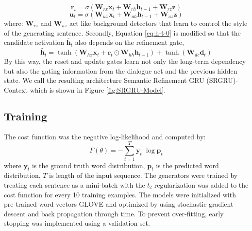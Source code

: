 \documentclass{llncs}
\begin{document}
\begin{equation}\label{eq:r-t-1} 
\textbf{r}_{t}=\sigma ({\textbf{W}_{rx}\textbf{x}_{t}+\textbf{W}_{rh}\textbf{h}_{t-1}+\textbf{W}_{rz}\textbf{z}})
\end{equation}
\begin{equation}\label{eq:u-t-1}
\textbf{u}_{t}=\sigma (\textbf{W}_{ux}\textbf{x}_{t}+\textbf{W}_{uh}\textbf{h}_{t-1}+\textbf{W}_{uz}\textbf{z})
\end{equation}
where: $\textbf{W}_{rz}$ and $\textbf{W}_{uz}$ act like background detectors that learn to control the style of the generating sentence. Secondly, Equation \eqref{eq:h-t-0} is modified so that the candidate activation $\tilde{\textbf{h}_{t}}$ also depends on the refinement gate,
\begin{equation}\label{eq:h-t-2}
\tilde{\textbf{h}_{t}}=\tanh(\textbf{W}_{hx}\textbf{x}_{t}+\textbf{r}_{t}\odot \textbf{W}_{hh}\textbf{h}_{t-1}) + \tanh(\textbf{W}_{dc}\textbf{d}_{t})
\end{equation}
By this way, the reset and update gates learn not only the long-term dependency but also the gating information from the dialogue act and the previous hidden state. We call the resulting architecture Semantic Refinement GRU (SRGRU)-Context which is shown in Figure \ref{fig:SRGRU-Model}.

\subsection{Training}\label{subsec:training}
The cost function was the negative log-likelihood and computed by:
\begin{equation}\label{eq:c-f-1}
F(\theta) = -\sum_{t=1}^{T}\textbf{y}_{t}^{\top}\log{\textbf{p}_{t}}
\end{equation}
where $\textbf{y}_{t}$ is the ground truth word distribution, $\textbf{p}_{t}$ is the predicted word distribution, $T$ is length of the input sequence. 
The generators were trained by treating each sentence as a mini-batch with the \textit{$l_{2}$} regularization was added to the cost function for every 10 training examples. The models were initialized with pre-trained word vectors GLOVE \cite{pennington2014glove} and optimized by using stochastic gradient descent and back propagation through time. To prevent over-fitting, early stopping was implemented using a validation set.
\end{document}
